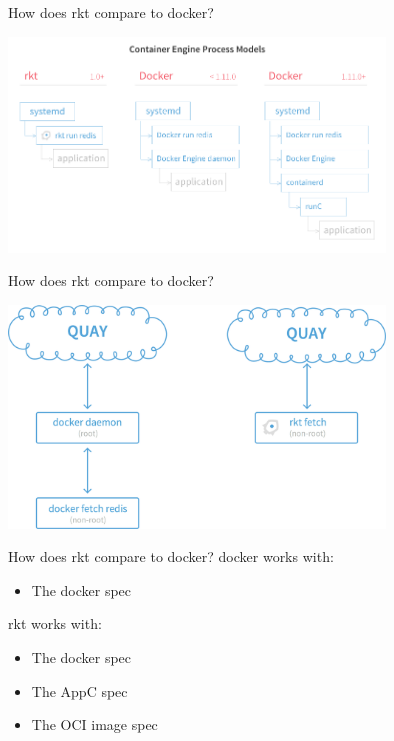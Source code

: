 \documentclass[pdf,aspectratio=169]{beamer}
\begin{document}
\begin{frame}{How does rkt compare to docker?}
    \begin{center}
        \includegraphics[width=0.75\textwidth]{rkt-vs-docker-process-model}
    \end{center}
\end{frame}

\begin{frame}{How does rkt compare to docker?}
    \begin{center}
        \includegraphics[width=0.75\textwidth]{rkt-vs-docker-fetch}
    \end{center}
\end{frame}

\begin{frame}{How does rkt compare to docker?}
    docker works with:
    \begin{itemize}
        \item The docker spec
    \end{itemize}
    \pause
    \vspace{1em}
    rkt works with:
    \begin{itemize}
        \item The docker spec
        \item The AppC spec
        \item The OCI image spec
    \end{itemize}
\end{frame}
\end{document}
